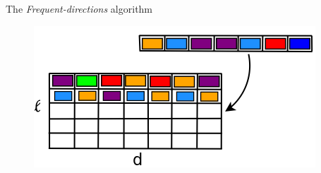 \documentclass[first=dgreen,second=purple,logo=redque]{aaltoslides}
\begin{document}
\begin{frame}[allowframebreaks=1]{The \textit{Frequent-directions} algorithm}
\framebreak

\begin{figure}
  \includegraphics[scale=0.4]{plots/fd6}
 \label{fig:fd6}
\end{figure} 

\end{frame}
\end{document}
